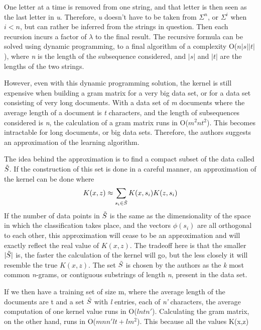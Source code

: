 \documentclass{article}
\begin{document}
One letter at a time is removed from one string, and that letter is then seen as the last letter in \textit{u}. Therefore, \textit{u} doesn't have to be taken from $\Sigma^n$, or $\Sigma^i$ when $i < n$, but can rather be inferred from the strings in question. Then each recursion incurs a factor of $\lambda$ to the final result. 
The recursive formula can be solved using dynamic programming, to a final algorithm of a complexity O($n|s||t|$), where \textit{n} is the length of the subsequence considered, and $|s|$ and $|t|$ are the lengths of the two strings.
\par
However, even with this dynamic programming solution, the kernel is still expensive when building a gram matrix for a very big data set, or for a data set consisting of very long documents. With a data set of \textit{m} documents where the average length of a document is \textit{t} characters, and the length of subsequences considered is \textit{n}, the calculation of a gram matrix runs in O($m^2 n t^2$). This becomes intractable for long documents, or big data sets. 
Therefore, the authors suggests an approximation of the learning algorithm. 

The idea behind the approximation is to find a compact subset of the data called $\Tilde{S}$. If the construction of this set is done in a careful manner, an approximation of the kernel can be done where
\begin{gather*}
    K(x, z) \approx \sum_{s_i \in \Tilde{S}} K(x,s_i) K(z, s_i)
\end{gather*}
If the number of data points in $\Tilde{S}$ is the same as the dimensionality of the space in which the classification takes place, and the vectors $\phi(s_i)$ are all orthogonal to each other, this approximation will cease to be an approximation and will exactly reflect the real value of $K(x,z)$. The tradeoff here is that the smaller $|\Tilde{S}|$ is, the faster the calculation of the kernel will go, but the less closely it will resemble the true $K(x,z)$. The set $\Tilde{S}$ is chosen by the authors as the \textit{k} most common \textit{n}-grams, or contiguous substrings of length \textit{n}, present in the data set.

If we then have a training set of size m, where the average length of the documents are t and a set $\Tilde{S}$ with \textit{l} entries, each of \textit{n'} characters, the average computation of one kernel value runs in O($lntn'$). Calculating the gram matrix, on the other hand, runs in O($mnn'lt + lm^2$). This because all the values K(x,z)
\end{document}
